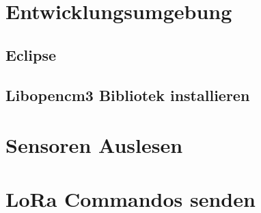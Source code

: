 \section{Entwicklungsumgebung}
\subsection{Eclipse}
\subsection{Libopencm3 Bibliotek installieren}
\section{Sensoren Auslesen} \label{Sensoren}
\section{LoRa Commandos senden}
